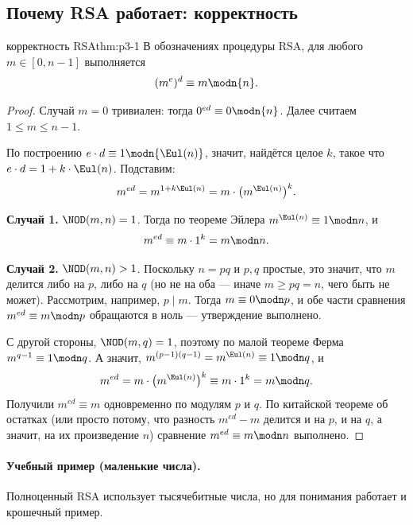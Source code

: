 \subsection{Почему RSA работает: корректность}

\begin{theorem}{корректность RSA}{thm:p3-1}
В обозначениях процедуры RSA, для любого $m \in [0, n-1]$ выполняется
\[
(m^e)^d \equiv m \modn{n}.
\]
\end{theorem}

\begin{proof}
Случай $m = 0$ тривиален: тогда $0^{ed} \equiv 0 \modn{n}$. Далее считаем $1 \le m \le n-1$.

По построению $e\cdot d \equiv 1 \modn{\Eul(n)}$, значит, найдётся целое $k$, такое что $e\cdot d = 1 + k\cdot \Eul(n)$. Подставим:
\[
m^{ed} = m^{1 + k\Eul(n)} = m\cdot \bigl(m^{\Eul(n)}\bigr)^k.
\]

\textbf{Случай 1.} $\NOD(m, n) = 1$. Тогда по теореме Эйлера $m^{\Eul(n)} \equiv 1 \modn n$, и
\[
m^{ed} \equiv m\cdot 1^k = m \modn n.
\]

\textbf{Случай 2.} $\NOD(m, n) > 1$. Поскольку $n = pq$ и $p, q$ простые, это значит, что $m$ делится либо на $p$, либо на $q$ (но не на оба --- иначе $m \ge pq = n$, чего быть не может). Рассмотрим, например, $p \mid m$. Тогда $m \equiv 0 \modn p$, и обе части сравнения $m^{ed} \equiv m \modn p$ обращаются в ноль --- утверждение выполнено.

С другой стороны, $\NOD(m, q) = 1$, поэтому по малой теореме Ферма $m^{q-1} \equiv 1 \modn q$. А значит, $m^{(p-1)(q-1)} = m^{\Eul(n)} \equiv 1 \modn q$, и
\[
m^{ed} = m\cdot \bigl(m^{\Eul(n)}\bigr)^k \equiv m\cdot 1^k = m \modn q.
\]
Получили $m^{ed} \equiv m$ одновременно по модулям $p$ и $q$. По китайской теореме об остатках (или просто потому, что разность $m^{ed} - m$ делится и на $p$, и на $q$, а значит, на их произведение $n$) сравнение $m^{ed} \equiv m \modn n$ выполнено. \qedhere
\end{proof}

\paragraph*{Учебный пример (маленькие числа).} Полноценный RSA использует тысячебитные числа, но для понимания работает и крошечный пример.

